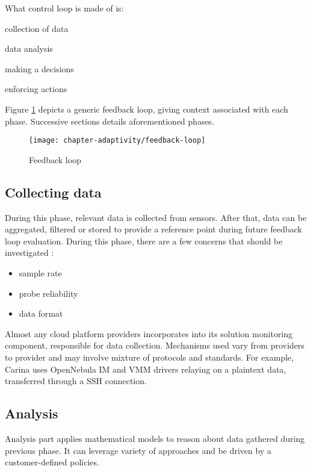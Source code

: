 What control loop is made of is:
\begin{inparaenum}[1)]
 \item collection of data
 \item data analysis
 \item making a decisions
 \item enforcing actions
\end{inparaenum}
Figure \ref{fig:feedback-loop} depicts a generic feedback loop, giving context associated with each phase. Successive sections details aforementioned phases.

\begin{figure}[!ht]
  \begin{center}
    \texttt{[image: chapter-adaptivity/feedback-loop]}
  \end{center}
  \caption{Feedback loop \cite{brun2009engineering}}
  \label{fig:feedback-loop}
\end{figure}

\subsection{Collecting data}
During this phase, relevant data is collected from sensors. After that, data can be aggregated, filtered or stored to provide a reference point during future feedback loop evaluation. During this phase, there are a few concerns that should be investigated \cite{brun2009engineering}:
\begin{itemize}
 \item sample rate
 \item probe reliability
 \item data format
\end{itemize}

Almost any cloud platform providers incorporates into its solution monitoring component, responsible for data collection. Mechanisms used vary from providers to provider and may involve mixture of protocols and standards. For example, Carina \cite{Carina} uses OpenNebula IM and VMM drivers relaying on a plaintext data, transferred through a SSH connection.

\subsection{Analysis}
Analysis part applies mathematical models to reason about data gathered during previous phase. It can leverage variety of approaches and be driven by a customer-defined policies.

